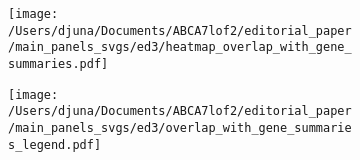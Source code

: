 \documentclass[12pt]{article}
\begin{document}
\begin{figure}[H] 
    \begin{subfigure}[t]{0.2\textwidth}
        \caption{}
        \texttt{[image: /Users/djuna/Documents/ABCA7lof2/editorial\_paper/main\_panels\_svgs/ed3/heatmap\_overlap\_with\_gene\_summaries.pdf]}        
    \end{subfigure}   
    \begin{subfigure}[t]{0.8\textwidth}
        \caption{}
        \vspace{1cm}
        \texttt{[image: /Users/djuna/Documents/ABCA7lof2/editorial\_paper/main\_panels\_svgs/ed3/overlap\_with\_gene\_summaries\_legend.pdf]}        
    \end{subfigure}   
\end{figure}
\end{document}
